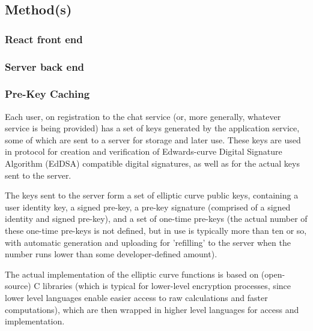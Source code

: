 \documentclass[12pt]{article}
\begin{document}
\newpage
\subsection{Method(s)}
\subsubsection{React front end}
\subsubsection{Server back end}
\subsubsection{Pre-Key Caching}
Each user, on registration to the chat service (or, more generally, whatever service is being provided) has a set of keys generated by the application service, some of which are sent to a server for storage and later use. These keys are used in protocol for creation and verification of Edwards-curve Digital Signature Algorithm (EdDSA) compatible digital signatures, as well as for the actual keys sent to the server. \parencite{website:sigdocXEdDSA} 
\par The keys sent to the server form a set of elliptic curve public keys, containing a user identity key, a signed pre-key, a pre-key signature (comprised of a signed identity and signed pre-key), and a set of one-time pre-keys \parencite{website:sigdocX3DH} (the actual number of these one-time pre-keys is not defined, but in use is typically more than ten or so, with automatic generation and uploading for 'refilling' to the server when the number runs lower than some developer-defined amount).
\par The actual implementation of the elliptic curve functions is based on (open-source) C libraries (which is typical for lower-level encryption processes, since lower level languages enable easier access to raw calculations and faster computations), which are then wrapped in higher level languages for access and implementation. \parencite{website:prglibsigtypescriptCurve25519}\parencite{website:prglibsigtypescriptCurve25519rawC}
\end{document}
